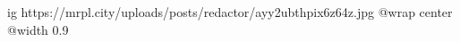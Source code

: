  
 
 
 
 

\ifcmt
  ig https://mrpl.city/uploads/posts/redactor/ayy2ubthpix6z64z.jpg
  @wrap center
  @width 0.9
\fi

